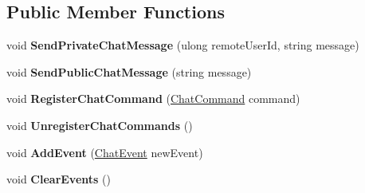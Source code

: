 \subsection*{Public Member Functions}
\begin{DoxyCompactItemize}
\item 
\hypertarget{class_s_e_mod_a_p_i_extensions_1_1_a_p_i_1_1_chat_manager_a5dbbe134fd56accdaf6385c31318fb62}{}void {\bfseries Send\+Private\+Chat\+Message} (ulong remote\+User\+Id, string message)\label{class_s_e_mod_a_p_i_extensions_1_1_a_p_i_1_1_chat_manager_a5dbbe134fd56accdaf6385c31318fb62}

\item 
\hypertarget{class_s_e_mod_a_p_i_extensions_1_1_a_p_i_1_1_chat_manager_a4e575b7bbb82880e949bbc71ba90947e}{}void {\bfseries Send\+Public\+Chat\+Message} (string message)\label{class_s_e_mod_a_p_i_extensions_1_1_a_p_i_1_1_chat_manager_a4e575b7bbb82880e949bbc71ba90947e}

\item 
\hypertarget{class_s_e_mod_a_p_i_extensions_1_1_a_p_i_1_1_chat_manager_ab16a08640180aa005b61baf7438a5ea9}{}void {\bfseries Register\+Chat\+Command} (\hyperlink{struct_s_e_mod_a_p_i_extensions_1_1_a_p_i_1_1_chat_manager_1_1_chat_command}{Chat\+Command} command)\label{class_s_e_mod_a_p_i_extensions_1_1_a_p_i_1_1_chat_manager_ab16a08640180aa005b61baf7438a5ea9}

\item 
\hypertarget{class_s_e_mod_a_p_i_extensions_1_1_a_p_i_1_1_chat_manager_a2ca3454b20d4bb85cef9cafba33c77f4}{}void {\bfseries Unregister\+Chat\+Commands} ()\label{class_s_e_mod_a_p_i_extensions_1_1_a_p_i_1_1_chat_manager_a2ca3454b20d4bb85cef9cafba33c77f4}

\item 
\hypertarget{class_s_e_mod_a_p_i_extensions_1_1_a_p_i_1_1_chat_manager_a286d52744105a9468b0cc1d5265aca79}{}void {\bfseries Add\+Event} (\hyperlink{struct_s_e_mod_a_p_i_extensions_1_1_a_p_i_1_1_chat_manager_1_1_chat_event}{Chat\+Event} new\+Event)\label{class_s_e_mod_a_p_i_extensions_1_1_a_p_i_1_1_chat_manager_a286d52744105a9468b0cc1d5265aca79}

\item 
\hypertarget{class_s_e_mod_a_p_i_extensions_1_1_a_p_i_1_1_chat_manager_a52f2c358cf5e58d2ca607d7a6e5b364c}{}void {\bfseries Clear\+Events} ()\label{class_s_e_mod_a_p_i_extensions_1_1_a_p_i_1_1_chat_manager_a52f2c358cf5e58d2ca607d7a6e5b364c}

\end{DoxyCompactItemize}
